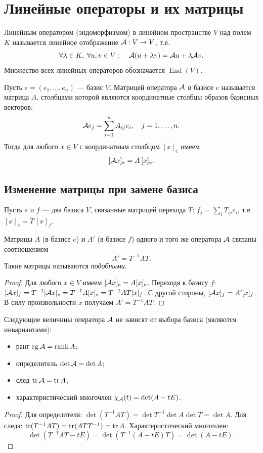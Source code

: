 \documentclass[10pt]{article}
\begin{document}
\section{Линейные операторы и их матрицы}

\begin{definition}
    Линейным оператором (эндоморфизмом) в линейном пространстве $V$ над полем $K$ называется линейное отображение $\mathcal{A}: V \to V$, т.е.
    \[
    \forall \lambda\in K,\; \forall u,v\in V:\quad \mathcal{A}(u+\lambda v)=\mathcal{A} u+\lambda\mathcal{A} v.
    \]
    Множество всех линейных операторов обозначается $\operatorname{End}(V)$.
\end{definition}

\begin{definition}
    Пусть $e=(e_1,\dots,e_n)$ --- базис $V$. Матрицей оператора $\mathcal{A}$ в базисе $e$ называется матрица $A$, столбцами которой являются координатные столбцы образов базисных векторов:
    \[
    \mathcal{A} e_j = \sum_{i=1}^n A_{ij} e_i,\quad j=1,\dots,n.
    \]
    Тогда для любого $x\in V$ с координатным столбцом $[x]_e$ имеем
    \[
    [\mathcal{A} x]_e = A\,[x]_e.
    \]
\end{definition}

\subsection{Изменение матрицы при замене базиса}

Пусть $e$ и $f$ --- два базиса $V$, связанные матрицей перехода $T$: $f_j = \sum_i T_{ij} e_i$, т.е. $[x]_e = T\,[x]_f$.

\begin{theorem}
    Матрицы $A$ (в базисе $e$) и $A'$ (в базисе $f$) одного и того же оператора $\mathcal{A}$ связаны соотношением
    \[
    A' = T^{-1} A T.
    \]
    Такие матрицы называются \textit{подобными}.
\end{theorem}
\begin{proof}
    Для любого $x\in V$ имеем $[\mathcal{A} x]_e = A [x]_e$. Переходя к базису $f$:
    $[\mathcal{A} x]_f = T^{-1} [\mathcal{A} x]_e = T^{-1} A [x]_e = T^{-1} A T [x]_f$.
    С другой стороны, $[\mathcal{A} x]_f = A' [x]_f$. В силу произвольности $x$ получаем $A' = T^{-1} A T$.
\end{proof}

\begin{corollary}
    Следующие величины оператора $\mathcal{A}$ не зависят от выбора базиса (являются инвариантами):
    \begin{itemize}
        \item ранг $\operatorname{rg}\mathcal{A} = \operatorname{rank} A$;
        \item определитель $\det\mathcal{A} = \det A$;
        \item след $\operatorname{tr}\mathcal{A} = \operatorname{tr} A$;
        \item характеристический многочлен $\chi_{\mathcal{A}}(t) = \det(A - tE)$.
    \end{itemize}
\end{corollary}
\begin{proof}
    Для определителя: $\det(T^{-1}AT)=\det T^{-1}\det A\det T = \det A$. Для следа: $\operatorname{tr}(T^{-1}AT)=\operatorname{tr}(ATT^{-1})=\operatorname{tr} A$. Характеристический многочлен:
    \[
    \det(T^{-1}AT - tE) = \det(T^{-1}(A-tE)T) = \det(A-tE).
    \]
\end{proof}
\end{document}
